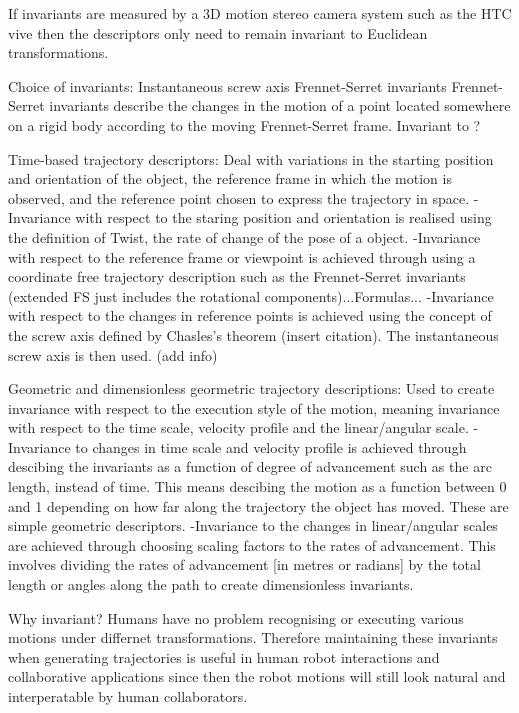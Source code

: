 \documentclass{article}
\begin{document}
If invariants are measured by a 3D motion stereo camera system such as the HTC vive then the descriptors only need to remain invariant to Euclidean transformations. 

Choice of invariants: 
Instantaneous screw axis 
Frennet-Serret invariants 
Frennet-Serret invariants describe the changes in the motion of a point located somewhere on a rigid body according to the moving Frennet-Serret frame. 
Invariant to ? 

Time-based trajectory descriptors: 
Deal with variations in the starting position and orientation of the object, the reference frame in which the motion is observed, and the reference point chosen to express the trajectory in space. 
-Invariance with respect to the staring position and orientation is realised using the definition of Twist, the rate of change of the pose of a object. 
-Invariance with respect to the reference frame or viewpoint is achieved through using a coordinate free trajectory description such as the Frennet-Serret invariants (extended FS just includes the rotational components)...Formulas...
-Invariance with respect to the changes in reference points is achieved using the concept of the screw axis defined by Chasles's theorem (insert citation). The instantaneous screw axis is then used. (add info) 

Geometric and dimensionless geormetric trajectory descriptions:
Used to create invariance with respect to the execution style of the motion, meaning invariance with respect to the time scale, velocity profile and the linear/angular scale.
-Invariance to changes in time scale and velocity profile is achieved through descibing the invariants as a function of degree of advancement such as the arc length, instead of time. 
This means descibing the motion as a function between 0 and 1 depending on how far along the trajectory the object has moved. These are simple geometric descriptors. 
-Invariance to the changes in linear/angular scales are achieved through choosing scaling factors to the rates of advancement. 
This involves dividing the rates of advancement [in metres or radians] by the total length or angles along the path to create dimensionless invariants. 

Why invariant?
Humans have no problem recognising or executing various motions under differnet transformations. Therefore maintaining these invariants when generating trajectories is useful in human robot interactions and collaborative applications since then the robot motions will still look natural and interperatable by human collaborators. 
\end{document}
